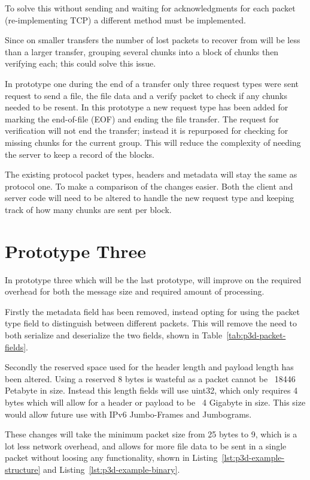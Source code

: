 To solve this without sending and waiting for acknowledgments for each packet (re-implementing TCP) a different method must be implemented.

Since on smaller transfers the number of lost packets to recover from will be less than a larger transfer, grouping several chunks into a block of chunks then verifying each; this could solve this issue.

In prototype one during the end of a transfer only three request types were sent request to send a file, the file data and a verify packet to check if any chunks needed to be resent. In this prototype a new request type has been added for marking the end-of-file (EOF) and ending the file transfer. The request for verification will not end the transfer; instead it is repurposed for checking for missing chunks for the current group. This will reduce the complexity of needing the server to keep a record of the blocks.

The existing protocol packet types, headers and metadata will stay the same as protocol one. To make a comparison of the changes easier. Both the client and server code will need to be altered to handle the new request type and keeping track of how many chunks are sent per block.


\section{Prototype Three}
In prototype three which will be the last prototype, will improve on the required overhead for both the message size and required amount of processing.

Firstly the metadata field has been removed, instead opting for using the packet type field to distinguish between different packets. This will remove the need to both serialize and deserialize the two fields, shown in Table~\ref{tab:p3d-packet-fields}.

Secondly the reserved space used for the header length and payload length has been altered. Using a reserved 8 bytes is wasteful as a packet cannot be ~18446 Petabyte in size. Instead this length fields will use uint32, which only requires 4 bytes which will allow for a header or payload to be ~4 Gigabyte in size. This size would allow future use with IPv6 Jumbo-Frames and Jumbograms.

These changes will take the minimum packet size from 25 bytes to 9, which is a lot less network overhead, and allows for more file data to be sent in a single packet without loosing any functionality, shown in Listing~\ref{lst:p3d-example-structure} and Listing~\ref{lst:p3d-example-binary}.

